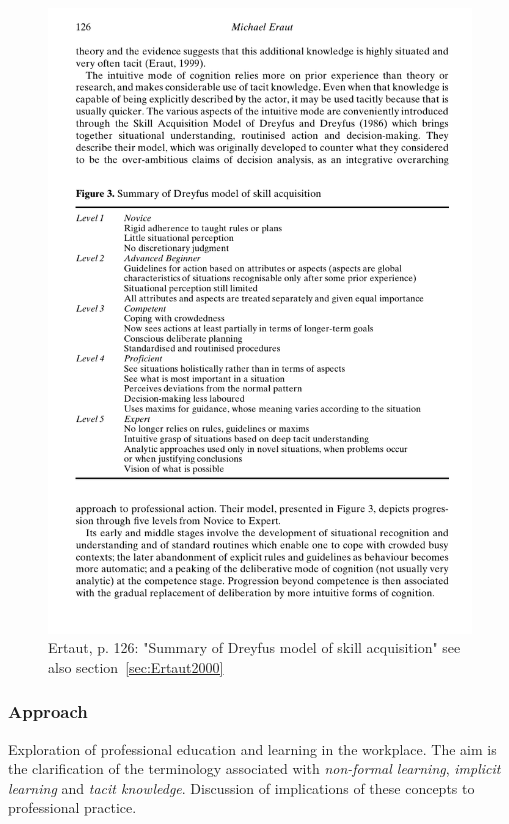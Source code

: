\documentclass[12pt,a4paper]{article}
\begin{document}
    \begin{figure}[htb]
      \centering
      \includegraphics[width=12cm]{Meeting 4 NON-FORMAL LEARNING - Seite 14.pdf}
      \caption{Ertaut, p. 126: "Summary of Dreyfus model of skill acquisition" see also section~\ref{sec:Ertaut2000}}
      \label{fig:Ertaut dreyfus}
    \end{figure}

    \subsubsection{Approach}
      Exploration of professional education and learning in the workplace. The aim is the clarification of the terminology associated with \emph{non-formal learning}, \emph{implicit learning} and \emph{tacit knowledge}. Discussion of implications of these concepts to professional practice.
\end{document}
